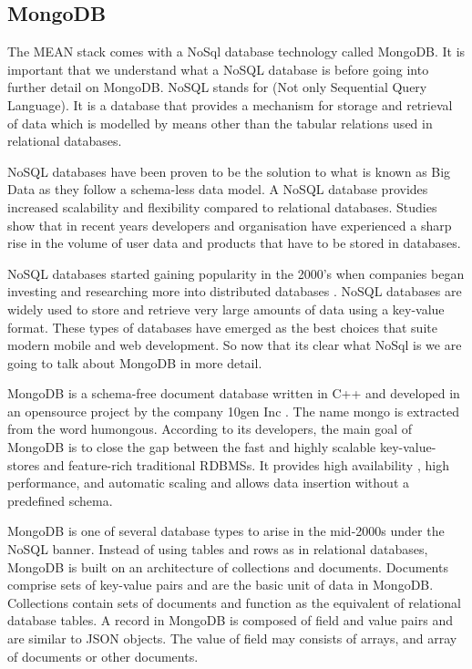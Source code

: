 \subsection{MongoDB}
The MEAN stack comes with a NoSql database technology called MongoDB.
It is important that we understand what a NoSQL database is before going into further detail on MongoDB. NoSQL stands for (Not only Sequential Query Language). It is a database that provides a mechanism for storage and retrieval of data which is modelled by means other than the tabular relations used in relational databases. 

NoSQL databases have been proven to be the solution to what is
known as Big Data as they follow a schema-less data model. A NoSQL database provides increased scalability and flexibility compared to relational databases. Studies show that in recent years developers and organisation have experienced a sharp rise in the volume of user data and products that have to be stored in databases. 

NoSQL databases started gaining popularity in the 2000’s when companies began investing and researching more into distributed databases \cite{no}.
NoSQL databases are widely used to store and retrieve very large amounts
of data using a key-value format. These types of databases have emerged
as the best choices that suite modern mobile and web development. So now that its clear what NoSql is we are going to talk about MongoDB in more detail.

MongoDB is a schema-free document database written in C++ and developed in an opensource project by the company 10gen Inc \cite{mongoname}. The name mongo is extracted from the word humongous. According to its developers, the main
goal of MongoDB is to close the gap between the fast and highly scalable key-value-stores and feature-rich traditional RDBMSs.
It provides high availability , high performance, and automatic scaling
and allows data insertion without a predefined schema. 

MongoDB is one of several database types to arise in the mid-2000s under the NoSQL banner. Instead of using tables and rows as in relational databases, MongoDB is built on an architecture of collections and documents. Documents comprise sets of key-value pairs and are the basic unit of data in MongoDB. Collections contain sets of documents and function as the equivalent of relational database tables. 
A record in MongoDB is composed of field and value pairs and are similar to
JSON objects. The value of field may consists of arrays, and array of documents
or other documents.

